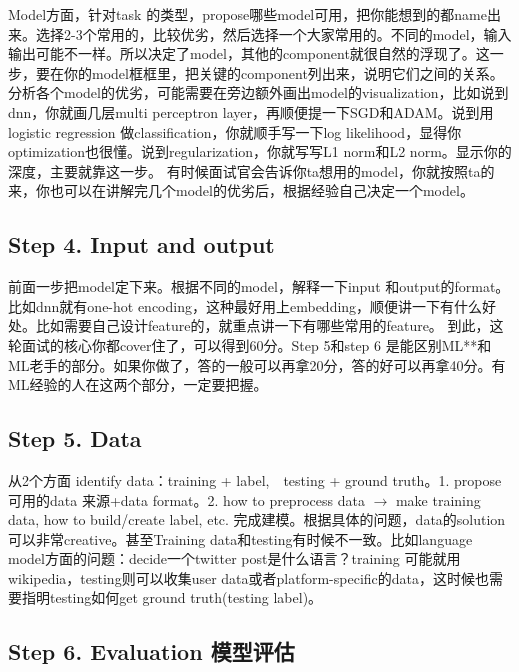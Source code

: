 \documentclass[12pt]{article}
\numberwithin{theorem}{section} %
\numberwithin{definition}{section} %
\numberwithin{assumption}{section} %
\numberwithin{lemma}{section} %
\numberwithin{remark}{section} %
\numberwithin{prop}{section} %
\numberwithin{corollary}{section} %
\numberwithin{example}{section} %
\numberwithin{question}{section} %
\numberwithin{problem}{section} %
\numberwithin{conjecture}{section} %
\numberwithin{append}{section} %
\numberwithin{property}{section} %
\begin{document}
\begin{CJK}{UTF8}{gbsn}
	Model方面，针对task 的类型，propose哪些model可用，把你能想到的都name出来。选择2-3个常用的，比较优劣，然后选择一个大家常用的。不同的model，输入输出可能不一样。所以决定了model，其他的component就很自然的浮现了。这一步，要在你的model框框里，把关键的component列出来，说明它们之间的关系。分析各个model的优劣，可能需要在旁边额外画出model的visualization，比如说到dnn，你就画几层multi perceptron layer，再顺便提一下SGD和ADAM。说到用logistic regression 做classification，你就顺手写一下log likelihood，显得你optimization也很懂。说到regularization，你就写写L1 norm和L2 norm。显示你的深度，主要就靠这一步。
	有时候面试官会告诉你ta想用的model，你就按照ta的来，你也可以在讲解完几个model的优劣后，根据经验自己决定一个model。
	
	\subsection{Step 4. Input and output}
	
	 前面一步把model定下来。根据不同的model，解释一下input 和output的format。比如dnn就有one-hot encoding，这种最好用上embedding，顺便讲一下有什么好处。比如需要自己设计feature的，就重点讲一下有哪些常用的feature。
	到此，这轮面试的核心你都cover住了，可以得到60分。Step 5和step 6 是能区别ML**和ML老手的部分。如果你做了，答的一般可以再拿20分，答的好可以再拿40分。有ML经验的人在这两个部分，一定要把握。
	
	\subsection{Step 5. Data}
	
	从2个方面 identify data：training + label,  testing + ground truth。1. propose 可用的data 来源+data format。2. how to preprocess data $\to$ make training data, how to build/create label, etc. 完成建模。根据具体的问题，data的solution可以非常creative。甚至Training data和testing有时候不一致。比如language model方面的问题：decide一个twitter post是什么语言？training 可能就用wikipedia，testing则可以收集user data或者platform-specific的data，这时候也需要指明testing如何get ground truth(testing label)。
	
	
	\subsection{Step 6. Evaluation 模型评估}
	

\end{CJK}
\end{document}
